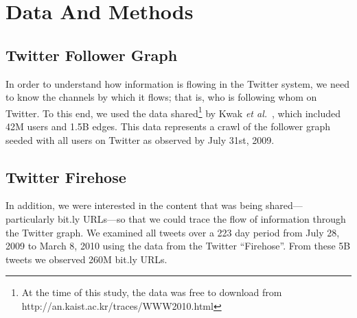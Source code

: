 \documentclass[phd,tocprelim]{cornell}
\begin{document}




\section{Data And Methods}
\subsection{Twitter Follower Graph}
\label{sec:follower}
In order to understand how information is flowing in the Twitter system, we
need to know the channels by which it flows; that is, who is following whom
on Twitter.  To this end, we used the data shared\footnote{At the time of this study, the data was free to download from http://an.kaist.ac.kr/traces/WWW2010.html} by Kwak \emph{et al.}~\cite{kwak_10}, which included 42M users and 1.5B edges.  This data
represents a crawl of the follower graph seeded with all users on Twitter as observed by July 31st, 2009.

\subsection{Twitter Firehose}
\label{sec:firehose}
In addition, we were interested in the content that was being
shared---particularly bit.ly URLs---so that we could trace the flow of
information through the Twitter graph.  We examined all tweets over a 223
day period from July 28, 2009 to March 8, 2010 using the data from the
Twitter ``Firehose''.  From these 5B tweets we observed 260M bit.ly URLs.
\end{document}

